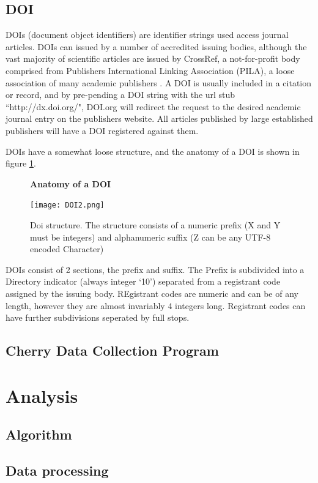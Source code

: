 \documentclass[11pt, oneside]{article}   	%
\begin{document}
\subsection{DOI}
\label{sec:DOI}
DOIs (document object identifiers) are identifier strings used access journal articles. DOIs can issued by a number of accredited issuing bodies, although the vast majority of scientific articles are issued by CrossRef, a not-for-profit body comprised from Publishers International Linking Association (PILA), a loose association of many academic publishers \cite{CROSSREF}. A DOI is usually included in a citation or record, and by pre-pending a DOI string with the url stub ``http://dx.doi.org/", DOI.org will redirect the request to the desired academic journal entry on the publishers website. All articles published by large established publishers will have a DOI registered against them.

DOIs have a somewhat loose structure, and the anatomy of a DOI is shown in figure \ref{fig:DOI}.

\begin{figure}[H]
    \centering
    \textbf{Anatomy of a DOI}\par\medskip
    \texttt{[image: DOI2.png]}
    \caption{Doi structure. The structure consists of a numeric prefix (X and Y must be integers) and alphanumeric suffix (Z can be any UTF-8 encoded Character) \label{fig:DOI}}
\end{figure}
DOIs consist of 2 sections, the prefix and suffix. The Prefix is subdivided into a Directory indicator (always integer `10') separated from a registrant code assigned by the issuing body. REgistrant codes are numeric and can be of any length, however they are almost invariably 4 integers long. Registrant codes can have further subdivisions seperated by full stops. 

\subsection{Cherry Data Collection Program}
\label{sec:CHERRY}

\label{sec:COLLECTIONSTRATEGY}
\section{Analysis}
\label{sec:ANALYSIS}
\subsection{Algorithm}
\subsection{Data processing}
\end{document}
